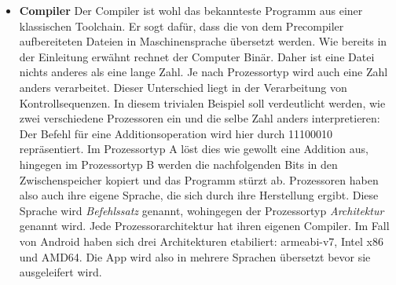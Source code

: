 \begin{itemize}
\item \textbf{Compiler} Der Compiler ist wohl das bekannteste Programm aus einer klassischen Toolchain. Er sogt dafür, dass die von dem Precompiler aufbereiteten Dateien in Maschinensprache übersetzt werden.
Wie bereits in der Einleitung erwähnt rechnet der Computer Binär. Daher ist eine Datei nichts anderes als eine lange Zahl. Je nach Prozessortyp wird auch eine Zahl anders verarbeitet. Dieser Unterschied liegt in der Verarbeitung von Kontrollsequenzen. In diesem trivialen Beispiel soll verdeutlicht werden, wie zwei verschiedene Prozessoren ein und die selbe Zahl anders interpretieren: Der Befehl für eine Additionsoperation wird hier durch 11100010 repräsentiert. Im Prozessortyp A löst dies wie gewollt eine Addition aus, hingegen im Prozessortyp B werden die nachfolgenden Bits in den Zwischenspeicher kopiert und das Programm stürzt ab. Prozessoren haben also auch ihre eigene Sprache, die sich durch ihre Herstellung ergibt. Diese Sprache wird \textit{Befehlssatz} genannt, wohingegen der Prozessortyp \textit{Architektur} genannt wird. Jede Prozessorarchitektur hat ihren eigenen Compiler.
Im Fall von Android haben sich drei Architekturen etabiliert: armeabi-v7, Intel x86 und AMD64. Die App wird also in mehrere Sprachen übersetzt bevor sie ausgeleifert wird.
\end{itemize}

\newpage

